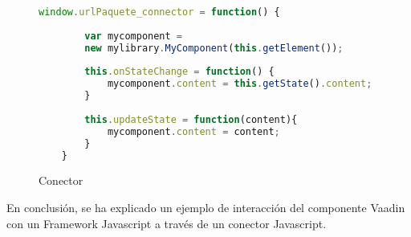 \begin{figure}[!tb]
	\centering
	\begin{lstlisting}[language=JavaScript]
	window.urlPaquete_connector = function() {
	
		var mycomponent = 
		new mylibrary.MyComponent(this.getElement());
		
		this.onStateChange = function() {
			mycomponent.content = this.getState().content;
		}
		
		this.updateState = function(content){
			mycomponent.content = content;
		}
	}\end{lstlisting}
	\caption{Conector}
	\label{fig:conectorDesc}
\end{figure}

En conclusión, se ha explicado un ejemplo de interacción del componente Vaadin con un Framework Javascript a través de un conector Javascript.